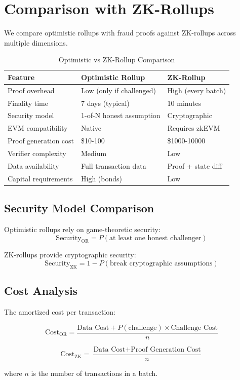 \section{Comparison with ZK-Rollups}


We compare optimistic rollups with fraud proofs against ZK-rollups across multiple dimensions.

\begin{table}[h]
\centering
\caption{Optimistic vs ZK-Rollup Comparison}
\begin{tabular}{lll}
\toprule
\textbf{Feature} & \textbf{Optimistic Rollup} & \textbf{ZK-Rollup} \\
\midrule
Proof overhead & Low (only if challenged) & High (every batch) \\
Finality time & 7 days (typical) & 10 minutes \\
Security model & 1-of-N honest assumption & Cryptographic \\
EVM compatibility & Native & Requires zkEVM \\
Proof generation cost & \$10-100 & \$1000-10000 \\
Verifier complexity & Medium & Low \\
Data availability & Full transaction data & Proof + state diff \\
Capital requirements & High (bonds) & Low \\
\bottomrule
\end{tabular}
\end{table}

\subsection{Security Model Comparison}

Optimistic rollups rely on game-theoretic security:
\begin{equation}
\text{Security}_{\text{OR}} = P(\text{at least one honest challenger})
\end{equation}

ZK-rollups provide cryptographic security:
\begin{equation}
\text{Security}_{\text{ZK}} = 1 - P(\text{break cryptographic assumptions})
\end{equation}

\subsection{Cost Analysis}

The amortized cost per transaction:

\begin{equation}
\text{Cost}_{\text{OR}} = \frac{\text{Data Cost} + P(\text{challenge}) \times \text{Challenge Cost}}{n}
\end{equation}

\begin{equation}
\text{Cost}_{\text{ZK}} = \frac{\text{Data Cost} + \text{Proof Generation Cost}}{n}
\end{equation}

where $n$ is the number of transactions in a batch.

